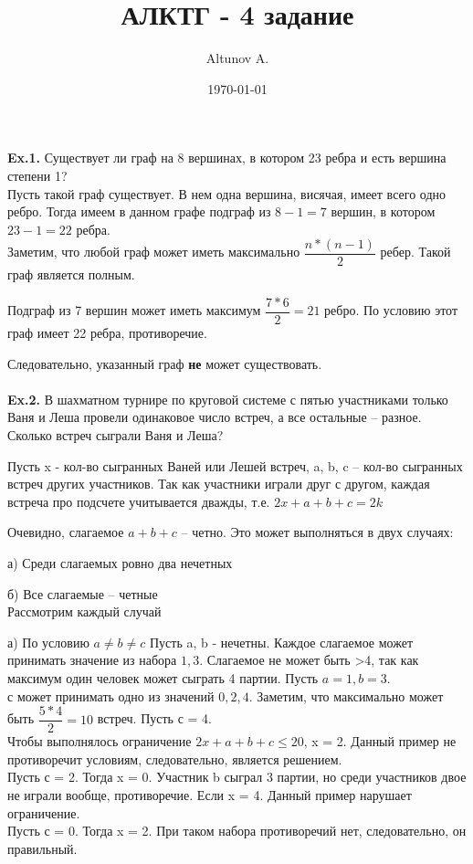 \documentclass[a4paper,12pt]{article}
\author{Altunov A.}
\title{АЛКТГ - 4 задание}
\date{\today}
\begin{document}
\maketitle
\newpage
\textbf{Ex.1.} Существует ли граф на 8 вершинах, в котором 23 ребра и есть вершина степени 1?
\\
Пусть такой граф существует. В нем одна вершина, висячая, имеет всего одно ребро. Тогда имеем в данном графе подграф из $8 - 1 = 7 $ вершин, в котором $ 23 - 1 = 22 $ ребра.
\\
Заметим, что любой граф может иметь максимально $ \dfrac{n*(n-1)}{2} $ ребер. Такой граф является полным. 

Подграф из 7 вершин может иметь максимум $ \dfrac{7*6}{2} = 21 $ ребро. По условию этот граф имеет 22 ребра, противоречие.

Следовательно, указанный граф \textbf{не} может существовать.
\\
\\
 
\textbf{Ex.2.} В шахматном турнире по круговой системе с пятью участниками только Ваня и Леша провели одинаковое число встреч, а все остальные -- разное. Сколько встреч сыграли Ваня и Леша?

Пусть x - кол-во сыгранных Ваней или Лешей встреч, a, b, c -- кол-во сыгранных встреч других участников. Так как участники играли друг с другом, каждая встреча про подсчете учитывается дважды, т.е. $2x + a + b + c = 2k $

Очевидно, слагаемое $ a + b + c $ -- четно. Это может выполняться в двух случаях:

а) Среди слагаемых ровно два нечетных

б) Все слагаемые -- четные  
\\
Рассмотрим каждый случай

а) По условию $ a \neq b \neq c $ Пусть a, b - нечетны. Каждое слагаемое может принимать значение из набора $ {1, 3} $. Слагаемое не может быть >4, так как максимум один человек может сыграть 4 партии. Пусть $ a = 1, b = 3 $.
\\
с может принимать одно из значений $ {0, 2, 4} $. Заметим, что максимально может быть $ \dfrac{5*4}{2} = 10 $ встреч. Пусть с = 4.
\\ 
Чтобы выполнялось ограничение $ 2x + a + b + c \leq 20 $, x = 2. Данный пример не противоречит условиям, следовательно, является решением. 
\\
Пусть с = 2. Тогда x = 0. Участник b сыграл 3 партии, но среди участников двое не играли вообще, противоречие. Если x = 4. Данный пример нарушает ограничение.
\\
Пусть с = 0. Тогда x = 2. При таком набора противоречий нет, следовательно, он правильный.
\end{document}
